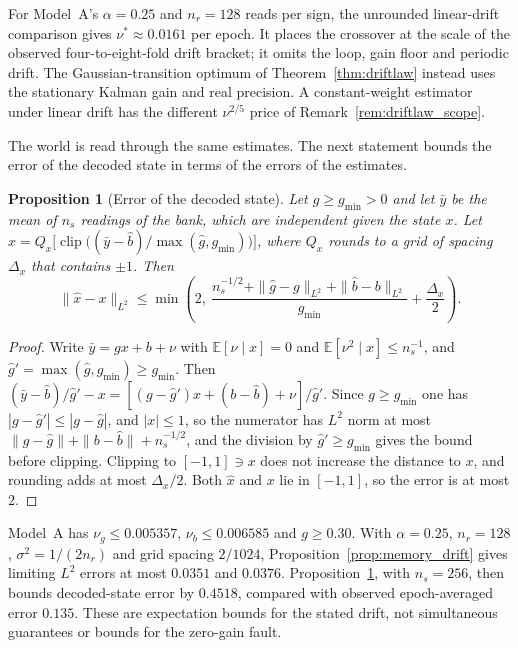 \documentclass[12pt]{article}
\newtheorem{proposition}[theorem]{Proposition}
\theoremstyle{definition}
\begin{document}
For Model~A's $\alpha=0.25$ and $n_r=128$ reads per sign, the unrounded linear-drift comparison gives $\nu^*\approx0.0161$ per epoch. It places the crossover at the scale of the observed four-to-eight-fold drift bracket; it omits the loop, gain floor and periodic drift. The Gaussian-transition optimum of Theorem~\ref{thm:driftlaw} instead uses the stationary Kalman gain and real precision. A constant-weight estimator under linear drift has the different $\nu^{2/5}$ price of Remark~\ref{rem:driftlaw_scope}.

The world is read through the same estimates. The next statement bounds the error of the decoded state in terms of the errors of the estimates.

\begin{proposition}[Error of the decoded state]\label{prop:decode_error}
Let $g\ge g_{\min}>0$ and let $\bar y$ be the mean of $n_s$ readings of the bank, which are independent given the state $x$. Let $\hat x=Q_x\bigl[\operatorname{clip}\bigl((\bar y-\hat b)/\max(\hat g,g_{\min})\bigr)\bigr]$, where $Q_x$ rounds to a grid of spacing $\Delta_x$ that contains $\pm1$. Then
\[
\|\hat x-x\|_{L^2}\le\min\!\left(2,\ \frac{n_s^{-1/2}+\|\hat g-g\|_{L^2}+\|\hat b-b\|_{L^2}}{g_{\min}}+\frac{\Delta_x}2\right).
\]
\end{proposition}
\begin{proof}
Write $\bar y=gx+b+\nu$ with $\mathbb E[\nu\mid x]=0$ and $\mathbb E[\nu^2\mid x]\le n_s^{-1}$, and $\hat g'=\max(\hat g,g_{\min})\ge g_{\min}$. Then $(\bar y-\hat b)/\hat g'-x=[(g-\hat g')x+(b-\hat b)+\nu]/\hat g'$. Since $g\ge g_{\min}$ one has $|g-\hat g'|\le|g-\hat g|$, and $|x|\le1$, so the numerator has $L^2$ norm at most $\|g-\hat g\|+\|b-\hat b\|+n_s^{-1/2}$, and the division by $\hat g'\ge g_{\min}$ gives the bound before clipping. Clipping to $[-1,1]\ni x$ does not increase the distance to $x$, and rounding adds at most $\Delta_x/2$. Both $\hat x$ and $x$ lie in $[-1,1]$, so the error is at most $2$.
\end{proof}

Model~A has $\nu_g\le0.005357$, $\nu_b\le0.006585$ and $g\ge0.30$. With $\alpha=0.25$, $n_r=128$, $\sigma^2=1/(2n_r)$ and grid spacing $2/1024$, Proposition~\ref{prop:memory_drift} gives limiting $L^2$ errors at most $0.0351$ and $0.0376$. Proposition~\ref{prop:decode_error}, with $n_s=256$, then bounds decoded-state error by $0.4518$, compared with observed epoch-averaged error $0.135$. These are expectation bounds for the stated drift, not simultaneous guarantees or bounds for the zero-gain fault.
\end{document}
